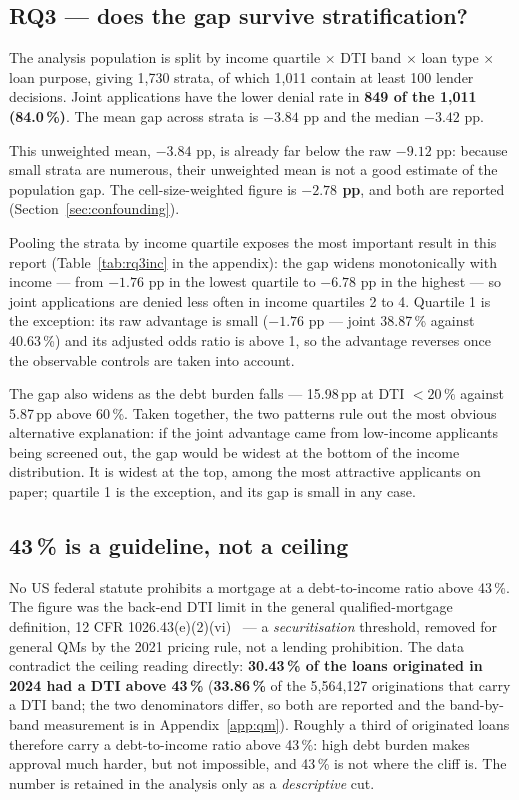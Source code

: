 \documentclass[sigconf,balance=false]{acmart}
\begin{document}
\subsection{RQ3 --- does the gap survive stratification?}

The analysis population is split by income quartile $\times$ DTI band $\times$
loan type $\times$ loan purpose, giving 1{,}730 strata, of which 1{,}011
contain at least 100 lender decisions. Joint applications have the lower
denial rate in \textbf{849 of the 1{,}011 (84.0\,\%)}. The mean gap across
strata is $-3.84$ pp and the median $-3.42$ pp.

This unweighted mean, $-3.84$ pp, is already far below the raw $-9.12$ pp:
because small strata are numerous, their unweighted mean is not a good
estimate of the population gap. The cell-size-weighted figure is
\textbf{$-2.78$ pp}, and both are reported
(Section~\ref{sec:confounding}).

Pooling the strata by income quartile exposes the most important result in
this report (Table~\ref{tab:rq3inc} in the appendix): the gap widens
monotonically with income --- from $-1.76$ pp in the lowest quartile to
$-6.78$ pp in the highest --- so joint applications are denied less often in
income quartiles 2 to 4. Quartile 1 is the exception: its raw advantage is
small ($-1.76$ pp --- joint 38.87\,\% against 40.63\,\%) and its adjusted
odds ratio is above 1, so the advantage reverses once the observable
controls are taken into account.

The gap also widens as the debt burden falls --- 15.98\,pp at DTI $<20\,\%$ against 5.87\,pp above 60\,\%. Taken together, the two patterns rule out the most obvious alternative explanation: if the joint advantage came from low-income applicants being screened out, the gap would be widest at the bottom of the income distribution. It is widest at the top, among the most attractive applicants on paper; quartile 1 is the exception, and its gap is small in any case.

\subsection{43\,\% is a guideline, not a ceiling}\label{sec:qm}

No US federal statute prohibits a mortgage at a debt-to-income ratio above
43\,\%. The figure was the back-end DTI limit in the general
qualified-mortgage definition, 12 CFR 1026.43(e)(2)(vi)~\cite{qm} --- a
\emph{securitisation} threshold, removed for general QMs by the 2021
pricing rule, not a lending prohibition. The data contradict the ceiling
reading directly: \textbf{30.43\,\% of the loans originated in 2024 had a
DTI above 43\,\%} (\textbf{33.86\,\%} of the 5{,}564{,}127 originations
that carry a DTI band; the two denominators differ, so both are reported
and the band-by-band measurement is in Appendix~\ref{app:qm}). Roughly a
third of originated loans therefore carry a debt-to-income ratio above
43\,\%: high debt burden makes approval much harder, but not impossible,
and 43\,\% is not where the cliff is. The number is retained in the
analysis only as a \emph{descriptive} cut.
\end{document}
